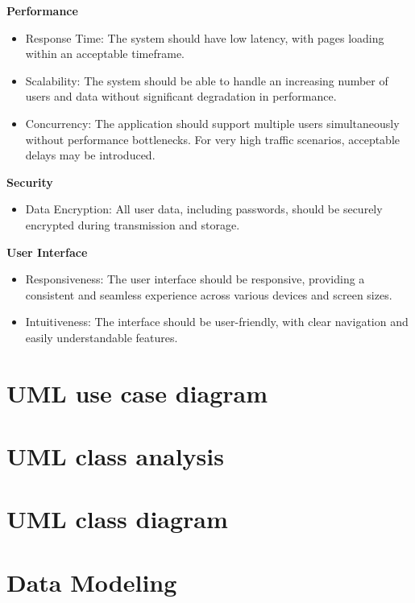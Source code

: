 \textbf{Performance}

\begin{itemize}
    \item Response Time: The system should have low latency, with pages loading within an acceptable timeframe.
    \item Scalability: The system should be able to handle an increasing number of users and data without significant degradation in performance.
    \item Concurrency: The application should support multiple users simultaneously without performance bottlenecks. For very high traffic scenarios, acceptable delays may be introduced.
\end{itemize}

\textbf{Security}

\begin{itemize}
    \item Data Encryption: All user data, including passwords, should be securely encrypted during transmission and storage.
\end{itemize}

\textbf{User Interface}

\begin{itemize}
    \item Responsiveness: The user interface should be responsive, providing a consistent and seamless experience across various devices and screen sizes.
    \item Intuitiveness: The interface should be user-friendly, with clear navigation and easily understandable features.
\end{itemize}

\section{UML use case diagram}


\section{UML class analysis}

\section{UML class diagram}
\section{Data Modeling}
